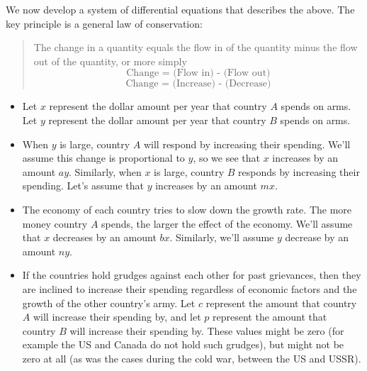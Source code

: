  We now develop a system of differential equations that describes the above.  The key principle is a general law of conservation:
\begin{quote}
 The change in a quantity equals the flow in of the quantity minus the flow out of the quantity, or more simply 
$$\text{Change = (Flow in) - (Flow out)}$$
$$\text{Change = (Increase) - (Decrease)}$$
\end{quote}
\begin{itemize}
\item Let $x$ represent the dollar amount per year that country $A$ spends on arms. Let $y$ represent the dollar amount per year that country $B$ spends on arms.  
\item When $y$ is large, country $A$ will respond by increasing their spending.  
We'll assume this change is proportional to $y$, so we see that $x$ increases by an amount $ay$. 
 Similarly, when $x$ is large, country $B$ responds by increasing their spending. Let's assume that $y$ increases by an amount $mx$.
\item The economy of each country tries to slow down the growth rate.  The more money country $A$ spends, the larger the effect of the economy.  We'll assume that $x$ decreases by an amount $bx$.  Similarly, we'll assume $y$ decrease by an amount $ny$.
\item If the countries hold grudges against each other for past grievances, then they are inclined to increase their spending regardless of economic factors and the growth of the other country's army.  Let $c$ represent the amount that country $A$ will increase their spending by, and let $p$ represent the amount that country $B$ will increase their spending by. These values might be zero (for example the US and Canada do not hold such grudges), but might not be zero at all (as was the cases during the cold war, between the US and USSR).
\end{itemize}

